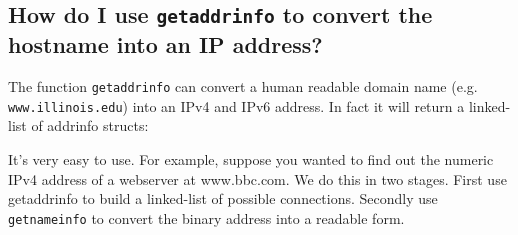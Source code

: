 \subsection{\texorpdfstring{How do I use \texttt{getaddrinfo} to convert
the hostname into an IP
address?}{How do I use getaddrinfo to convert the hostname into an IP address?}}\label{how-do-i-use-getaddrinfo-to-convert-the-hostname-into-an-ip-address}

The function \texttt{getaddrinfo} can convert a human readable domain
name (e.g. \texttt{www.illinois.edu}) into an IPv4 and IPv6 address. In
fact it will return a linked-list of addrinfo structs:

\begin{Shaded}
\begin{Highlighting}[]
 
                  
                  
                  
                  
     
                
     
\NormalTok{\};}
\end{Highlighting}
\end{Shaded}

It's very easy to use. For example, suppose you wanted to find out the
numeric IPv4 address of a webserver at www.bbc.com. We do this in two
stages. First use getaddrinfo to build a linked-list of possible
connections. Secondly use \texttt{getnameinfo} to convert the binary
address into a readable form.

